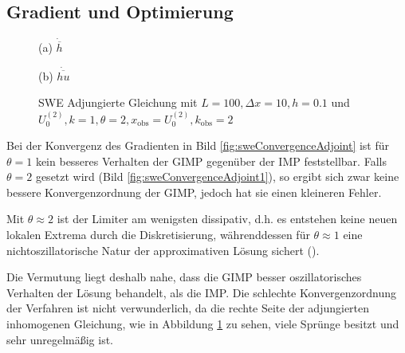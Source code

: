 \subsection{Gradient und Optimierung}
\begin{figure}[H]
\footnotesize
\begin{minipage}[b]{0.49\linewidth}
\centering

\caption*{(a) $\dot{\overline{h}}$}
\end{minipage}
\begin{minipage}[b]{0.49\linewidth}
\centering

\caption*{(b) $\dot{\overline{hu}}$}
\end{minipage}
\caption{SWE Adjungierte Gleichung mit $L=100,\Delta x=10,h = 0.1$ und $U_0^{(2)},k=1,\theta=2,x_{\text{obs}}=U_0^{(2)},k_{\text{obs}}=2$}
\label{fig:sweAdjointEqRHS}
\end{figure}
Bei der Konvergenz des Gradienten in Bild \ref{fig:sweConvergenceAdjoint} ist für $\theta=1$ kein besseres Verhalten der GIMP gegenüber der IMP feststellbar. Falls $\theta=2$ gesetzt wird (Bild \ref{fig:sweConvergenceAdjoint1}), so ergibt sich zwar keine bessere Konvergenzordnung der GIMP, jedoch hat sie einen kleineren Fehler. 

Mit $\theta\approx 2$ ist der Limiter am wenigsten dissipativ, d.h. es entstehen keine neuen lokalen Extrema durch die Diskretisierung, währenddessen für $\theta\approx 1$ eine nichtoszillatorische Natur der approximativen Lösung sichert (\cite[Abschnitt 6]{kurganov2000new}).

Die Vermutung liegt deshalb nahe, dass die GIMP besser oszillatorisches Verhalten der Lösung behandelt, als die IMP.
Die schlechte Konvergenzordnung der Verfahren ist nicht verwunderlich, da die rechte Seite der adjungierten inhomogenen Gleichung, wie in Abbildung \ref{fig:sweAdjointEqRHS} zu sehen, viele Sprünge besitzt und sehr unregelmäßig ist.

